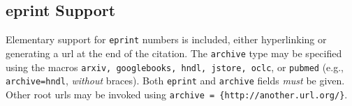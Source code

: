 \documentclass[subscriptcorrection,upint,varvw,barcolor=Goldenrod3,mathalfa=cal=euler,balance,hyphenate,french,pdf-a]{asmejour} %
\begin{document}
\begin{table}[t]
\caption{A simple table\label{tab:1}}
%
\end{table}




\begin{table}[t]
\caption{Table with more complicated columns}\label{tab:2}%
%
\end{table}


\subsection{eprint Support} Elementary support for \texttt{eprint} numbers is included, either hyperlinking or generating a url at the end of the citation. The \texttt{archive} type may be specified using the macros \texttt{arxiv, googlebooks, hndl, jstore, oclc}, or \texttt{pubmed} (e.g., \texttt{archive=hndl},  \textit{without} braces). Both \texttt{eprint} and \texttt{archive} fields \textit{must} be given. Other root urls may be invoked using \verb|archive = {http://another.url.org/}|.
\end{document}
